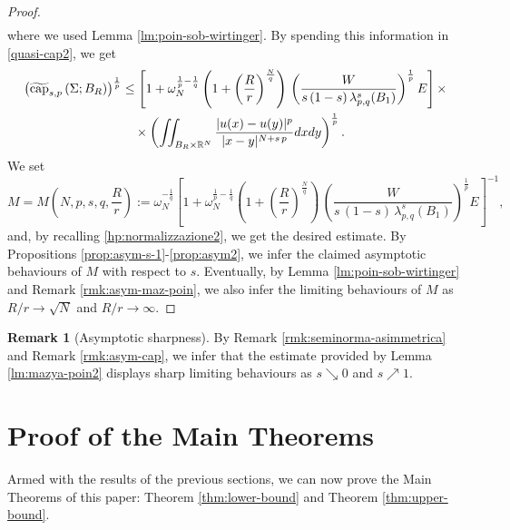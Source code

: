 \documentclass{amsart}
\theoremstyle{definition}
\newtheorem{remark}[theorem]{Remark}
\numberwithin{equation}{section}
\begin{document}
\begin{proof}
\[\begin{split}
	\end{split}
	\]
	where we used Lemma \ref{lm:poin-sob-wirtinger}. By spending this information in \eqref{quasi-cap2}, we get 
	\[
	\begin{split}
		\left(\widetilde{\rm cap}_{s,p}\left(\Sigma; B_{R}\right)\right)^{\frac{1}{p}} &\le \left[1+ \omega_N^{\frac{1}{p} - \frac{1}{q}}  \left(1+ \left(\frac{R}{r}\right)^{\frac{N}{q}} \right)\, \left(\frac{W}{s\,(1-s)\,\lambda_{p,q}^s(B_1)}\right)^{\frac{1}{p}} E\right] \times \\
		&\quad \times \left(\iint_{B_R \times \mathbb{R}^N} \frac{|u(x) - u(y)|^p}{|x-y|^{N+s\,p}}dxdy\right)^{\frac{1}{p}}.
	\end{split}
	\]
	We set
	\begin{equation} \label{esplicita}
		M = M\left(N, p, s, q, \frac{R}{r}\right) := \omega_N^{-\frac{1}{q}}\left[1+ \omega_N^{\frac{1}{p} - \frac{1}{q}}  \left(1+ \left(\frac{R}{r}\right)^{\frac{N}{q}} \right)\, \left(\frac{W}{s\,(1-s)\,\lambda_{p,q}^s(B_1)}\right)^{\frac{1}{p}} E\right]^{-1},
	\end{equation}
	and, by recalling \eqref{hp:normalizzazione2}, we get the desired estimate. By Propositions \ref{prop:asym-s-1}-\ref{prop:asym2}, we infer the claimed asymptotic behaviours of $M$ with respect to $s$. Eventually, by Lemma \ref{lm:poin-sob-wirtinger} and Remark \ref{rmk:asym-maz-poin}, we also infer the limiting behaviours of $M$ as $R/r \to \sqrt{N}$ and $R/r \to \infty$. 
\end{proof}

\begin{remark}[Asymptotic sharpness] \label{asym-costante-mps}
 By Remark \ref{rmk:seminorma-asimmetrica} and Remark \ref{rmk:asym-cap}, we infer that the estimate provided by Lemma \ref{lm:mazya-poin2} displays sharp limiting behaviours as $s \searrow 0$ and $s \nearrow 1$. 
\end{remark}

\section{Proof of the Main Theorems} \label{sec:5}
Armed with the results of the previous sections, we can now prove the Main Theorems of this paper: Theorem \ref{thm:lower-bound} and Theorem \ref{thm:upper-bound}. 
\end{document}
